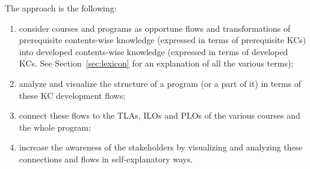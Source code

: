 The approach is the following: 
\begin{enumerate}
	\item consider courses and programs as opportune flows and
		transformations of prerequisite contents-wise knowledge
		(expressed in terms of prerequisite \acp{KC}) into developed
		contents-wise knowledge (expressed in terms of developed
		\acp{KC}. See Section~\ref{sec:lexicon} for an explanation
		of all the various terms); 
	\item analyze and visualize the structure of a program (or a part of
		it) in terms of these \ac{KC} development flows;
	\item connect these flows to the \acp{TLA}, \acp{ILO} and \acp{PLO}
		of the various courses and the whole program;
	\item increase the awareness of the stakeholders by visualizing and
		analyzing these connections and flows in self-explanatory
		ways.
\end{enumerate}

